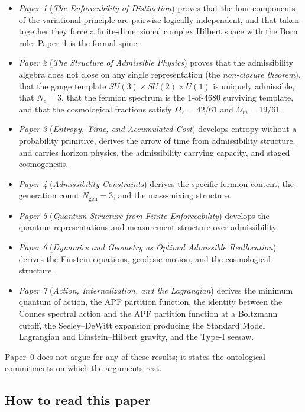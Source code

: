 \documentclass[11pt]{article}
\newcommand{\paperref}[2]{\emph{Paper #1} (\emph{#2})}
\begin{document}
\begin{itemize}
    \item \paperref{1}{The Enforceability of Distinction} proves that the four components of the variational principle are pairwise logically independent, and that taken together they force a finite-dimensional complex Hilbert space with the Born rule. Paper~1 is the formal spine.
    \item \paperref{2}{The Structure of Admissible Physics} proves that the admissibility algebra does not close on any single representation (the \emph{non-closure theorem}), that the gauge template $SU(3) \times SU(2) \times U(1)$ is uniquely admissible, that $N_c = 3$, that the fermion spectrum is the 1-of-4680 surviving template, and that the cosmological fractions satisfy $\Omega_\Lambda = 42/61$ and $\Omega_m = 19/61$.
    \item \paperref{3}{Entropy, Time, and Accumulated Cost} develops entropy without a probability primitive, derives the arrow of time from admissibility structure, and carries horizon physics, the admissibility carrying capacity, and staged cosmogenesis.
    \item \paperref{4}{Admissibility Constraints} derives the specific fermion content, the generation count $N_{\mathrm{gen}} = 3$, and the mass-mixing structure.
    \item \paperref{5}{Quantum Structure from Finite Enforceability} develops the quantum representations and measurement structure over admissibility.
    \item \paperref{6}{Dynamics and Geometry as Optimal Admissible Reallocation} derives the Einstein equations, geodesic motion, and the cosmological structure.
    \item \paperref{7}{Action, Internalization, and the Lagrangian} derives the minimum quantum of action, the APF partition function, the identity between the Connes spectral action and the APF partition function at a Boltzmann cutoff, the Seeley--DeWitt expansion producing the Standard Model Lagrangian and Einstein--Hilbert gravity, and the Type-I seesaw.
\end{itemize}

Paper~0 does not argue for any of these results; it states the ontological commitments on which the arguments rest.

\subsection*{How to read this paper}
\end{document}
